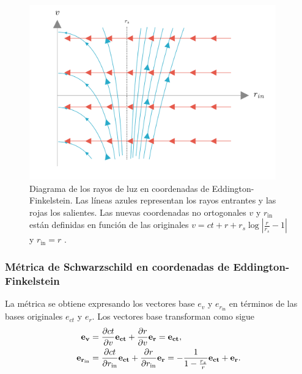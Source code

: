 \begin{figure}[H]
    \begin{small}
        \begin{center}
            \includegraphics[width=0.95\textwidth]{AgujerosNegros/Schwarzschild/media/images/EddingtonFinkelsteinVR_ManimCE_v0.19.0.png}
        \end{center}
        \caption{Diagrama de los rayos de luz en coordenadas de Eddington-Finkelstein. Las líneas azules representan los rayos entrantes y las rojas los salientes. Las nuevas coordenadas no ortogonales \(v\) y \(r_{\text{in}}\) están definidas en función de las originales \(v = ct + r + r_s \log \left| \frac{r}{r_s} - 1 \right|\) y \(r_{\text{in}} = r\) .}
    \end{small}
\end{figure}

\subsubsection{Métrica de Schwarzschild en coordenadas de Eddington-Finkelstein}
La métrica se obtiene expresando los vectores base \( e_v \) y \( e_{r_{\text{in}}} \) en términos de las bases originales \( e_{ct} \) y \( e_r \). 
Los vectores base transforman como sigue
\begin{equation}
    \begin{aligned}
        \mathbf{e_v}               & = \frac{\partial ct}{\partial v} \mathbf{e_{ct}} + \frac{\partial r}{\partial v} \mathbf{e_r} = \mathbf{e_{ct}},                                                            \\
        \mathbf{e_{r_{\text{in}}} }& = \frac{\partial ct}{\partial r_{\text{in}}} \mathbf{e_{ct}} + \frac{\partial r}{\partial r_{\text{in}}} \mathbf{e_r} = -\frac{1}{1 - \frac{r_s}{r}} \mathbf{e_{ct}} + \mathbf{e_r}.
    \end{aligned}
\end{equation}

